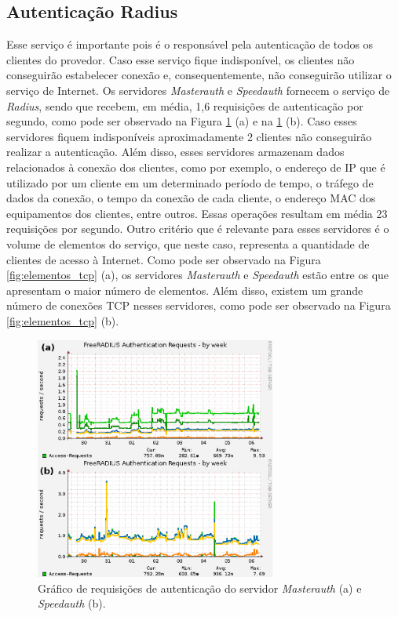 \subsection{Autenticação Radius}
\label{section:radius}

Esse serviço é importante pois é o responsável pela autenticação de todos os clientes do provedor. Caso esse serviço fique indisponível, 
os clientes não conseguirão estabelecer conexão e, consequentemente, não conseguirão utilizar o serviço de Internet. Os servidores 
\textit{Masterauth} e \textit{Speedauth} fornecem o serviço de \textit{Radius}, sendo que recebem, em média, 1,6 requisições de autenticação 
por segundo, como pode ser observado na Figura \ref{fig:freeradius_auth} (a) e na \ref{fig:freeradius_auth} (b). Caso esses servidores fiquem 
indisponíveis aproximadamente 2 clientes não conseguirão realizar a autenticação. Além disso, esses servidores armazenam dados relacionados à 
conexão dos clientes, como por exemplo, o endereço de \ac{IP} que é utilizado por um cliente em um determinado período de tempo, o tráfego de 
dados da conexão, o tempo da conexão de cada cliente, o endereço \ac{MAC} dos equipamentos dos clientes, entre outros. Essas operações resultam 
em média 23 requisições por segundo. %
Outro critério que é relevante para esses servidores é o volume de elementos do serviço, que neste caso, representa a quantidade de clientes de
acesso à Internet. Como pode ser observado na Figura \ref{fig:elementos_tcp} (a), os servidores \textit{Masterauth} e \textit{Speedauth}
estão entre os que apresentam o maior número de elementos. Além disso, existem um grande número de conexões \ac{TCP} nesses servidores, como 
pode ser observado na Figura \ref{fig:elementos_tcp} (b).

\begin{figure}[h!]
 \centering
 \includegraphics[width=300px]{img/freeradius_auth.eps}
 \caption{Gráfico de requisições de autenticação do servidor \textit{Masterauth} (a) e \textit{Speedauth} (b).}
 \label{fig:freeradius_auth}
\end{figure}

